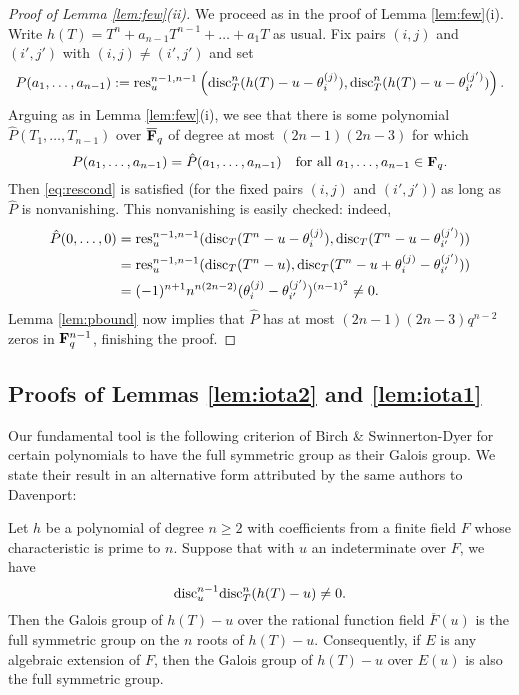 \documentclass[a4paper]{compositio}
\begin{document}
\begin{proof}[Proof of Lemma \ref{lem:few}(ii)] We proceed as in the
proof of Lemma \ref{lem:few}(i). Write $h(T) = T^n + a_{n-1}T^{n-1}+
\dots + a_1 T$ as usual. Fix pairs $(i,j)$ and $(i', j')$ with
$(i,j) \neq (i', j')$ and set
\[ P(a_1, \dots, a_{n-1}):= \mathrm{res}_{u}^{n-1,n-1}\left(\mathrm{disc}_{T}^n{(h(T)-u-\theta_{i}^{(j)})},
\mathrm{disc}_{T}^n{(h(T)-u-\theta_{i'}^{(j')})}\right). \] Arguing as in
Lemma \ref{lem:few}(i), we see that there is some polynomial
$\hat{P}(T_1, \dots, T_{n-1})$ over $\overline{\mathbf{F}}_q$ of degree at
most $(2n-1)(2n-3)$ for which
\[ P(a_1, \dots, a_{n-1}) = \hat{P}(a_1, \dots, a_{n-1}) \quad\text{for all $a_1, \dots, a_{n-1} \in \mathbf{F}_q$}. \]
Then \eqref{eq:rescond} is satisfied (for the fixed pairs $(i,j)$
and $(i',j')$) as long as $\hat{P}$ is nonvanishing. This
nonvanishing is easily checked: indeed,
\begin{align*}
 \hat{P}(0,\dots,0)&= \mathrm{res}_{u}^{n-1,n-1}(\mathrm{disc}_T(T^n - u
 -\theta_{i}^{(j)}),\mathrm{disc}_T(T^n-u-\theta_{i'}^{(j')})) \\
&= \mathrm{res}_{u}^{n-1,n-1}(\mathrm{disc}_T(T^n
-u),\mathrm{disc}_T(T^n-u+\theta_{i}^{(j)}-\theta_{i'}^{(j')}))\\ &=
(-1)^{n+1} n^{n(2n-2)}
(\theta_{i}^{(j)}-\theta_{i'}^{(j')})^{(n-1)^2} \neq 0.\end{align*}
Lemma \ref{lem:pbound} now implies that $\hat{P}$ has at most
$(2n-1)(2n-3)q^{n-2}$ zeros in $\mathbf{F}_q^{n-1}$, finishing the proof.
\end{proof}



\subsection{Proofs of Lemmas \ref{lem:iota2} and \ref{lem:iota1}}
Our fundamental tool is the following criterion of Birch \&
Swinnerton-Dyer \cite{bs59} for certain polynomials to have the full
symmetric group as their Galois group. We state their result in an
alternative form attributed by the same authors to Davenport:

\begin{bsd}\label{lem:bsd} Let $h$ be a
polynomial of degree $n\geq 2$ with coefficients from a finite field
$F$ whose characteristic is prime to $n$. Suppose that with $u$ an
indeterminate over $F$, we have
\begin{equation}\label{eq:bsdcriterion}
\mathrm{disc}_u^{n-1}\mathrm{disc}_{T}^n (h(T)-u) \neq 0.
\end{equation}
Then the Galois group of $h(T)-u$ over the rational function field
$\overline{F}(u)$ is the full symmetric group on the $n$ roots of
$h(T)-u$. Consequently, if $E$ is any algebraic extension of $F$,
then the Galois group of $h(T)-u$ over $E(u)$ is also the full
symmetric group.
\end{bsd}
\end{document}
